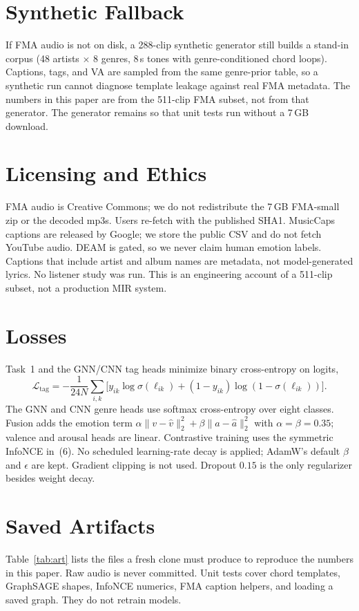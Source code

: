 \documentclass[conference]{IEEEtran}
\begin{document}
\section{Synthetic Fallback}
If FMA audio is not on disk, a 288-clip synthetic generator still builds a stand-in corpus (48 artists $\times$ 8 genres, 8\,s tones with genre-conditioned chord loops). Captions, tags, and VA are sampled from the same genre-prior table, so a synthetic run cannot diagnose template leakage against real FMA metadata. The numbers in this paper are from the 511-clip FMA subset, not from that generator. The generator remains so that unit tests run without a 7\,GB download.

\section{Licensing and Ethics}
\balance
FMA audio is Creative Commons; we do not redistribute the 7\,GB FMA-small zip or the decoded mp3s. Users re-fetch with the published SHA1. MusicCaps captions are released by Google; we store the public CSV and do not fetch YouTube audio. DEAM is gated, so we never claim human emotion labels. Captions that include artist and album names are metadata, not model-generated lyrics. No listener study was run. This is an engineering account of a 511-clip subset, not a production MIR system.

\section{Losses}
Task~1 and the GNN/CNN tag heads minimize binary cross-entropy on logits,
\begin{equation}
\mathcal{L}_{\mathrm{tag}}=-\frac1{24N}\sum_{i,k}\big[y_{ik}\log\sigma(\ell_{ik})+(1-y_{ik})\log(1-\sigma(\ell_{ik}))\big].
\end{equation}
The GNN and CNN genre heads use softmax cross-entropy over eight classes. Fusion adds the emotion term $\alpha\|v-\hat v\|_2^2+\beta\|a-\hat a\|_2^2$ with $\alpha=\beta=0.35$; valence and arousal heads are linear. Contrastive training uses the symmetric InfoNCE in~(6). No scheduled learning-rate decay is applied; AdamW's default $\beta$ and $\epsilon$ are kept. Gradient clipping is not used. Dropout $0.15$ is the only regularizer besides weight decay.

\section{Saved Artifacts}
Table~\ref{tab:art} lists the files a fresh clone must produce to reproduce the numbers in this paper. Raw audio is never committed. Unit tests cover chord templates, GraphSAGE shapes, InfoNCE numerics, FMA caption helpers, and loading a saved graph. They do not retrain models.
\end{document}
